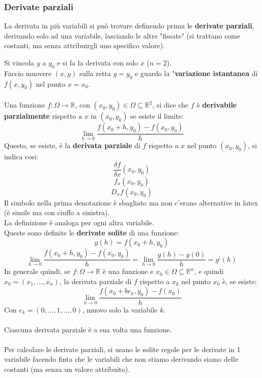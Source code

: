 \documentclass[12pt,a4paper]{article}
\begin{document}
\subsubsection{Derivate parziali}
La derivata in più variabili si può trovare definendo prima le \textbf{derivate parziali}, derivando solo ad una variabile, lasciando le altre "fissate" (si trattano come costanti, ma senza attribuirgli uno specifico valore).\\
Si vincola $y$ a $y_0$ e si fa la derivata con solo $x$ ($n=2$).\\
Faccio muovere $(x,y)$ sulla retta $y = y_0$ e guardo la "\textbf{variazione istantanea} di $f(x,y_0)$ nel punto $x = x_0$.\\\\
Una funzione $f:\Omega \to \mathbb{R}$, con $(x_0,y_0) \in \Omega \subseteq \mathbb{R}^2$, si dice che $f$ è \textbf{derivabile parzialmente} rispetto a $x$ in $(x_0,y_0)$ se esiste il limite:
\[
\lim_{h \to 0} \frac{f(x_0 + h, y_0) - f(x_0,y_0)}{h}
\]
Questo, se esiste, è la \textbf{derivata parziale} di $f$ rispetto a $x$ nel punto $(x_0,y_0)$, si indica cosi:
\[
\frac{\delta f}{\delta x} (x_0,y_0)
\]
\[
f_x(x_0,y_0)
\]
\[
D_x f(x_0,y_0)
\]
Il simbolo nella prima denotazione è sbagliato ma non c'erano alternative in latex (è simile ma con ciuffo a sinistra).\\
La definizione è analoga per ogni altra variabile.\\
Queste sono definite le \textbf{derivate solite} di una funzione:
\[
g(h) = f(x_0 + h, y_0)
\]
\[
\lim_{h \to 0} \frac{f(x_0 + h, y_0) - f(x_0,y_0)}{h} = \lim_{h \to 0} \frac{g(h) - g(0)}{h} = g^|(h)
\]
In generale quindi, se $f:\Omega \to \mathbb{R}$ è una funzione e $x_0 \in \Omega \subseteq \mathbb{R}^n$, e quindi $x_0 = (x_1,\ldots,x_n)$, la derivata parziale di $f$ rispetto a $x_k$ nel punto $x_0$ è, se esiste:
\[
\lim_{h \to 0} \frac{f(x_0 + be_k, y_0) - f(x_0)}{h}
\]
Con $e_k = (0,\ldots,1,\ldots,0)$, muovo solo la variabile $k$.\\\\
Ciascuna derivata parziale è a sua volta una funzione.\\\\
Per calcolare le derivate parziali, si usano le solite regole per le derivate in 1 variabile facendo finta che le variabili che non stiamo derivando siamo delle costanti (ma senza un valore attribuito).
\end{document}
